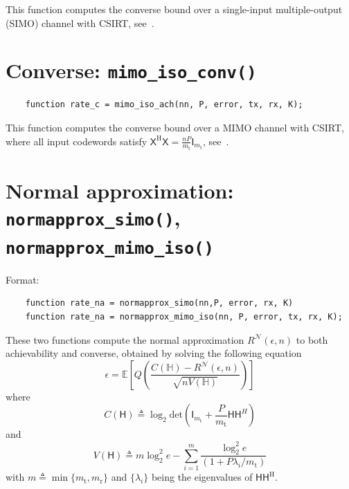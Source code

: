 \documentclass[a4paper,11p]{memoir}
\def\txant{m_{\mathrm{t}}} %
\def\rxant{m_{\mathrm{r}}} %
\def\bl{n} %
\begin{document}
This function computes the converse bound over a single-input multiple-output (SIMO) channel with CSIRT, see~\cite[Eq.~(76)]{yang14-07a}.

\section{Converse: \texttt{mimo\_iso\_conv()}}
\begin{verbatim}
	function rate_c = mimo_iso_ach(nn, P, error, tx, rx, K);
\end{verbatim}

This function computes the converse bound over a MIMO channel with CSIRT, where all input codewords satisfy $\mathsf{X}^{\mathrm{H}}\mathsf{X} = \frac{\bl P}{\txant}\mathsf{I}_{\txant}$, see~\cite[Eq.~(78)]{yang14-07a}. 



\section[Normal approximation]{Normal approximation: \texttt{normapprox\_simo()}, \texttt{normapprox\_mimo\_iso()}}

Format:
\begin{verbatim}
	function rate_na = normapprox_simo(nn,P, error, rx, K)
	function rate_na = normapprox_mimo_iso(nn, P, error, tx, rx, K);
\end{verbatim}

These two functions compute the normal approximation $R^{\mathcal{N}}(\epsilon,\bl)$ to both achievability and converse, obtained by solving the following equation
	$$ \epsilon  =\mathbb{E}\mathopen{}\left[Q\mathopen{}\left(\frac{C(\mathbb{H}) - R^{\mathcal{N}}(\epsilon,\bl) }{\sqrt{ n V(\mathbb{H}) }}\right)\right]$$
where
$$C(\mathsf{H}) \triangleq \log_2 \mathrm{det}\mathopen{} \left(\mathsf{I}_{\txant} + \frac{P}{\txant} \mathsf{H} \mathsf{H}^{H} \right)$$
and
$$V(\mathsf{H}) \triangleq  m\log_2^2 e  - \sum\limits_{i=1}^{m } \frac{\log_2^2 e}{(1+P\lambda_i/\txant)}$$
with $m \triangleq \min\{\txant , \rxant\}$ and $\{\lambda_i\}$ being the eigenvalues of $\mathsf{H}\mathsf{H}^{\mathrm{H}}$.


%
%
%
%











\end{document}
